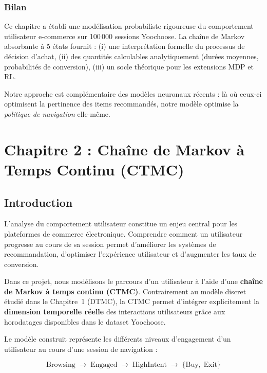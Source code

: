 \documentclass[11pt,a4paper]{article}
\begin{document}
\subsubsection{Bilan}

Ce chapitre a établi une modélisation probabiliste rigoureuse
du comportement utilisateur e-commerce sur 100\,000 sessions Yoochoose.
La chaîne de Markov absorbante à 5 états fournit :
(i) une interprétation formelle du processus de décision d'achat,
(ii) des quantités calculables analytiquement (durées moyennes,
probabilités de conversion),
(iii) un socle théorique pour les extensions MDP et RL.

Notre approche est complémentaire des modèles neuronaux récents
\citep{hidasi2016,quadrana2017,li2017narm} : là où ceux-ci optimisent
la pertinence des items recommandés, notre modèle optimise
la \emph{politique de navigation} elle-même.
\newpage
\section{Chapitre 2 : Chaîne de Markov à Temps Continu (CTMC)}

\subsection{Introduction}

L'analyse du comportement utilisateur constitue un enjeu central pour les plateformes
de commerce électronique. Comprendre comment un utilisateur progresse au cours de sa
session permet d'améliorer les systèmes de recommandation, d'optimiser l'expérience
utilisateur et d'augmenter les taux de conversion.

Dans ce projet, nous modélisons le parcours d'un utilisateur à l'aide d'une
\textbf{chaîne de Markov à temps continu (CTMC)}. Contrairement au modèle discret
étudié dans le Chapitre~1 (DTMC), la CTMC permet d'intégrer explicitement la
\textbf{dimension temporelle réelle} des interactions utilisateurs grâce aux
horodatages disponibles dans le dataset Yoochoose.

Le modèle construit représente les différents niveaux d'engagement d'un utilisateur
au cours d'une session de navigation :

\[
\text{Browsing} \;\rightarrow\;
\text{Engaged} \;\rightarrow\;
\text{HighIntent} \;\rightarrow\;
\{\text{Buy},\; \text{Exit}\}
\]
\end{document}
